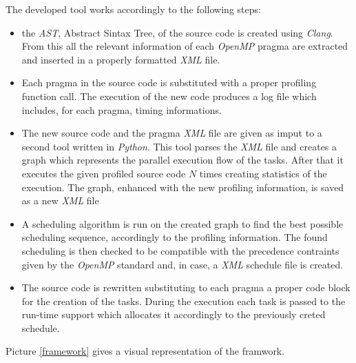 \documentclass[a4paper,11pt,oneside]{book}
\begin{document}
The developed tool works accordingly to the following steps:
\begin{itemize}
\item{the \emph{AST}, Abstract Sintax Tree, of the source code is created using \emph{Clang}. From this all the relevant information of each \emph{OpenMP} pragma are extracted and inserted in a properly formatted \emph{XML} file.}
\item{Each pragma in the source code is substituted with a proper profiling function call. The execution of the new code produces a log file which includes, for each pragma, timing informations.  }
\item{The new source code and the pragma \emph{XML} file are given as imput to a second tool written in \emph{Python}. This tool parses the \emph{XML} file and creates a graph which represents the parallel execution flow of the tasks. After that it executes the given profiled source code $N$ times creating statistics of the execution. The graph, enhanced with the new profiling information, is saved as a new \emph{XML} file}
\item{ A scheduling algorithm is run on the created graph to find the best possible scheduling sequence, accordingly to the profiling information. The found scheduling is then checked to be compatible with the precedence contraints given by the \emph{OpenMP} standard and, in case, a \emph{XML} schedule file is created.}
\item{ The source code is rewritten substituting to each pragma a proper code block for the creation of the tasks. During the execution each task is passed to the run-time support which allocates it accordingly to the previously creted schedule.}
\end{itemize}

Picture \ref{framework} gives a visual representation of the framwork.
\end{document}

